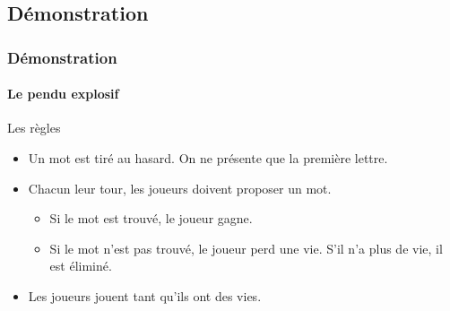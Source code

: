 \documentclass{beamer}
\begin{document}
    \subsection{Démonstration}
    \begin{frame}
      \frametitle{Démonstration}
      \framesubtitle{Le pendu explosif}
      \begin{block}{Les règles}
        \begin{itemize}
          \item Un mot est tiré au hasard. On ne présente que la première lettre.
          \item Chacun leur tour, les joueurs doivent proposer un mot.
          \begin{itemize}
            \item Si le mot est trouvé, le joueur gagne.
            \item Si le mot n'est pas trouvé, le joueur perd une vie. S'il n'a plus de vie, il est éliminé.
          \end{itemize}
          \item Les joueurs jouent tant qu'ils ont des vies.
        \end{itemize}
      \end{block}
    \end{frame}
  
\end{document}
